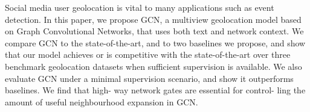Social media user geolocation is vital to many applications such as event detection. In this paper, we propose GCN, a multiview geolocation model based on Graph Convolutional Networks, that uses both text and network context. We compare GCN to the state-of-the-art, and to two baselines we propose, and show that our model achieves or is competitive with the state-of-the-art over three benchmark geolocation datasets when sufficient supervision is available. We also evaluate GCN under a minimal supervision scenario, and show it outperforms baselines. We find that high- way network gates are essential for control- ling the amount of useful neighbourhood expansion in GCN.
